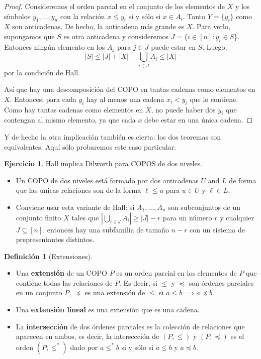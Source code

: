 \documentclass[spanish]{book}
\theoremstyle{definition}
\newtheorem*{defn}{Definición}
\newtheorem*{ejer}{Ejercicio}
\begin{document}
\begin{proof}
	Consideremos el orden parcial en el conjunto de los elementos de $X$ y los símbolos $y_1,\ldots,y_n$ con la relación $x\leq y_i$ si y sólo si $x\in A_i$. Tanto $Y=\{y_i\}$ como $X$ son anticadenas. De hecho, la anticadena más grande es $X$. Para verlo, supongamos que $S$ es otra anticadena y consideremos $J=\{i\in[n]:y_i\in S\}$. Entonces ningún elemento en los $A_j$ para $j\in J$ puede estar en $S$. Luego,
	\[|S|\leq|J|+|X|-\bigcup_{i\in J}A_i\leq|X|\]
	por la condición de Hall.
	
	Así que hay una descomposición del COPO en tantas cadenas como elementos en $X$. Entonces, para cada $y_i$ hay al menos una cadena $x_i<y_i$ que lo contiene. Como hay tantas cadenas como elementos en $X$, no puede haber dos $y_i$ que contengan al mismo elemento, ya que cada $x$ debe estar en una única cadena.
\end{proof}
Y de hecho la otra implicación también es cierta: los dos teoremas son equivalentes. Aquí sólo probaremos este caso particular:
\begin{ejer}
	Hall implica Dilworth para COPOS de dos niveles. 
	\begin{itemize}
		\item Un COPO de dos niveles está formado por dos anticadenas $U$ and $L$ de forma que las únicas relaciones son de la forma $\ell\leq u$ para $u\in U$ y $\ell\in L$.
		\item Conviene usar esta variante de Hall: si $A_1,\ldots,A_n$ son subconjuntos de un conjunto finito $X$ tales que $\left|\bigcup_{i\in J}A_i\right|\geq|J|-r$ para un número $r$ y cualquier $J\subseteq [n]$, entonces hay una subfamilia de tamaño $n-r$ con un sistema de prepresentantes distintos.
	\end{itemize}
\end{ejer}

\begin{defn}[Extensiones]\leavevmode
	\begin{itemize}
		\item Una \textbf{extensión} de un COPO $P$ es un orden parcial en los elementos de $P$ que contiene todas las relaciones de $P$. Es decir, si $\leq$ y $\preccurlyeq$ son órdenes parciales en un conjunto $P$, $\preccurlyeq$ es una extensión de $\leq$ si $a\leq b\implies a\preccurlyeq b$.
		
		\item Una \textbf{extensión lineal} es una extensión que es una cadena.
		
		\item La \textbf{intersección} de dos órdenes parciales es la colección de relaciones que aparecen en ambos, es decir, la intersección de $(P,\leq)$ y $(P,\preccurlyeq)$ es el orden $(P,\leq^*)$ dado por $a\leq^*b$ si y sólo si $a\leq b$ y $a\preccurlyeq b$.
	\end{itemize}
\end{defn}
\end{document}
